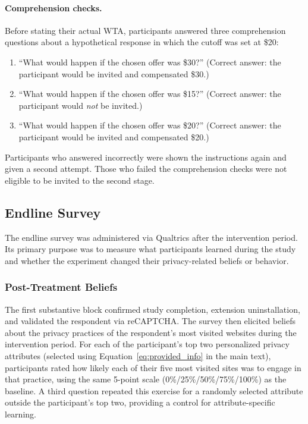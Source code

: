 \documentclass[12pt]{article}
\theoremstyle{definition}
\theoremstyle{remark}
\begin{document}
\begin{appendix}
\paragraph{Comprehension checks.} Before stating their actual WTA, participants answered three comprehension questions about a hypothetical response in which the cutoff was set at \$20:
\begin{enumerate}[leftmargin=2em,itemsep=1pt]
    \item ``What would happen if the chosen offer was \$30?'' (Correct answer: the participant would be invited and compensated \$30.)
    \item ``What would happen if the chosen offer was \$15?'' (Correct answer: the participant would \emph{not} be invited.)
    \item ``What would happen if the chosen offer was \$20?'' (Correct answer: the participant would be invited and compensated \$20.)
\end{enumerate}
Participants who answered incorrectly were shown the instructions again and given a second attempt. Those who failed the comprehension checks were not eligible to be invited to the second stage.

\subsection{Endline Survey}\label{sec:endline_survey}

The endline survey was administered via Qualtrics after the intervention period. Its primary purpose was to measure what participants learned during the study and whether the experiment changed their privacy-related beliefs or behavior.

\subsubsection{Post-Treatment Beliefs}\label{sec:survey_endline_beliefs}

The first substantive block confirmed study completion, extension uninstallation, and validated the respondent via reCAPTCHA. The survey then elicited beliefs about the privacy practices of the respondent's most visited websites during the intervention period. For each of the participant's top two personalized privacy attributes (selected using Equation~\eqref{eq:provided_info} in the main text), participants rated how likely each of their five most visited sites was to engage in that practice, using the same 5-point scale (0\%/25\%/50\%/75\%/100\%) as the baseline. A third question repeated this exercise for a randomly selected attribute outside the participant's top two, providing a control for attribute-specific learning.


\end{appendix}
\end{document}
